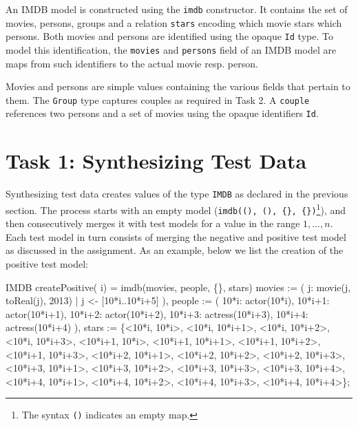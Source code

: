 \documentclass[submission,copyright,creativecommons]{eptcs}
\begin{document}
An IMDB model is constructed using the \texttt{imdb} constructor. It contains the set of movies, persons, groups and a relation \texttt{stars} encoding which movie stars which persons. 
Both movies and persons are identified using the opaque \texttt{Id} type. 
To model this identification, the \texttt{movies} and \texttt{persons} field of an IMDB model are maps from such identifiers to the actual movie resp. person. 

Movies and persons are simple values containing the various fields that pertain to them. 
The \texttt{Group} type captures couples as required in Task 2. A \texttt{couple} references two persons and a set of movies using the opaque identifiers \texttt{Id}. 



\section*{Task 1: Synthesizing Test Data}

Synthesizing test data creates values of the type \texttt{IMDB} as declared in the previous section. The process starts with an empty model (\texttt{imdb((), (), \{\}, \{\})}\footnote{The syntax \texttt{()} indicates an empty map.}), and then consecutively merges it with test models for a value in the range $1,...,n$.
Each test model in turn consists of merging the negative and positive test model as discussed in the assignment. 
As an example, below we list the creation of the positive test model:
\begin{rascal}
IMDB createPositive( i) = imdb(movies, people, \{\}, stars)
     movies := ( j: movie(j, toReal(j), 2013) | j \textless{}- {}[10*i..10*i+5] ),
         people := ( 10*i: actor(10*i), 10*i+1: actor(10*i+1), 
                     10*i+2: actor(10*i+2), 10*i+3: actress(10*i+3), 
                     10*i+4: actress(10*i+4) ),
         stars := \{{}\textless{}10*i, 10*i\textgreater{}, \textless{}10*i, 10*i+1\textgreater{}, \textless{}10*i, 10*i+2\textgreater{}, \textless{}10*i, 10*i+3\textgreater{},
                 \textless{}10*i+1, 10*i\textgreater{}, \textless{}10*i+1, 10*i+1\textgreater{}, \textless{}10*i+1, 10*i+2\textgreater{}, \textless{}10*i+1, 10*i+3\textgreater{},
                 \textless{}10*i+2, 10*i+1\textgreater{}, \textless{}10*i+2, 10*i+2\textgreater{}, \textless{}10*i+2, 10*i+3\textgreater{},
                 \textless{}10*i+3, 10*i+1\textgreater{}, \textless{}10*i+3, 10*i+2\textgreater{}, \textless{}10*i+3, 10*i+3\textgreater{}, \textless{}10*i+3, 10*i+4\textgreater{},
                 \textless{}10*i+4, 10*i+1\textgreater{}, \textless{}10*i+4, 10*i+2\textgreater{}, \textless{}10*i+4, 10*i+3\textgreater{}, \textless{}10*i+4, 10*i+4\textgreater{}\}{};          
\end{rascal}
\end{document}
